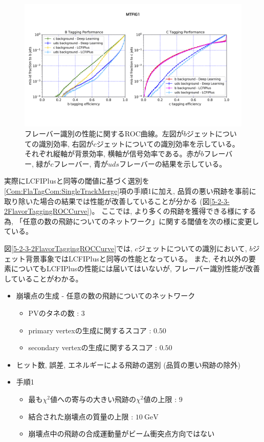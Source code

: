 \begin{figure}[htbp]
 \centering
 \includegraphics[trim = 0 150 0 200, width=1.0\textwidth, clip]{Figure/5Comparison/5-2-3-1FlavorTaggingROCCurve.png}
 \caption[フレーバータギングの性能に関するROC曲線]{フレーバー識別の性能に関するROC曲線。左図が$b$ジェットについての識別効率, 右図が$c$ジェットについての識別効率を示している。それぞれ縦軸が背景効率, 横軸が信号効率である。赤が$b$フレーバー, 緑が$c$フレーバー, 青が$uds$フレーバーの結果を示している。}
 \label{5-2-3-1FlavorTaggingROCCurve}
\end{figure}

実際にLCFIPlusと同等の閾値に基づく選別を\ref{Com:FlaTagCom:SingleTrackMerge}項の手順1に加え, 品質の悪い飛跡を事前に取り除いた場合の結果では性能が改善していることが分かる (図\ref{5-2-3-2FlavorTaggingROCCurve})。
ここでは, より多くの飛跡を獲得できる様にする為, 「任意の数の飛跡についてのネットワーク」に関する閾値を次の様に変更している。

図\ref{5-2-3-2FlavorTaggingROCCurve}では, $c$ジェットについての識別において, $b$ジェット背景事象ではLCFIPlusと同等の性能となっている。
また, それ以外の要素についてもLCFIPlusの性能には届いてはいないが, フレーバー識別性能が改善していることがわかる。

\newpage
\begin{itemize}
 \item 崩壊点の生成 - 任意の数の飛跡についてのネットワーク
 \begin{itemize}
   \item PVのタネの数 : $3$
   \item primary vertexの生成に関するスコア : $0.50$
   \item secondary vertexの生成に関するスコア : $0.50$
 \end{itemize}
 \item ヒット数, 誤差, エネルギーによる飛跡の選別 (品質の悪い飛跡の除外)
 \item 手順1
 \begin{itemize}
  \item 最も$\chi^2$値への寄与の大きい飛跡の$\chi^2$値の上限 : $9$
  \item 結合された崩壊点の質量の上限 : $10\ \mathrm{GeV}$
  \item 崩壊点中の飛跡の合成運動量がビーム衝突点方向ではない
 \end{itemize}
\end{itemize}

